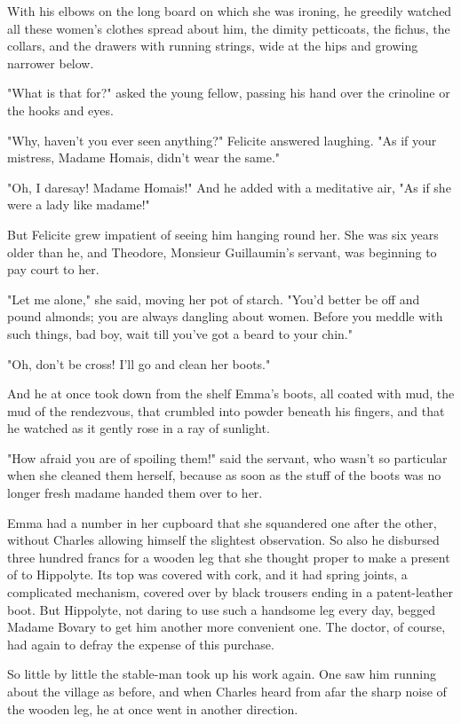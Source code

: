 \documentclass{tufte-book}
\begin{document}
With his elbows on the long board on which she was ironing, he
greedily watched all these women's clothes spread about him, the dimity
petticoats, the fichus, the collars, and the drawers with running
strings, wide at the hips and growing narrower below.

"What is that for?" asked the young fellow, passing his hand over the
crinoline or the hooks and eyes.

"Why, haven't you ever seen anything?" Felicite answered laughing. "As
if your mistress, Madame Homais, didn't wear the same."

"Oh, I daresay! Madame Homais!" And he added with a meditative air, "As
if she were a lady like madame!"

But Felicite grew impatient of seeing him hanging round her. She was six
years older than he, and Theodore, Monsieur Guillaumin's servant, was
beginning to pay court to her.

"Let me alone," she said, moving her pot of starch. "You'd better be
off and pound almonds; you are always dangling about women. Before you
meddle with such things, bad boy, wait till you've got a beard to your
chin."

"Oh, don't be cross! I'll go and clean her boots."

And he at once took down from the shelf Emma's boots, all coated with
mud, the mud of the rendezvous, that crumbled into powder beneath his
fingers, and that he watched as it gently rose in a ray of sunlight.

"How afraid you are of spoiling them!" said the servant, who wasn't so
particular when she cleaned them herself, because as soon as the stuff
of the boots was no longer fresh madame handed them over to her.

Emma had a number in her cupboard that she squandered one after the
other, without Charles allowing himself the slightest observation. So
also he disbursed three hundred francs for a wooden leg that she thought
proper to make a present of to Hippolyte. Its top was covered with cork,
and it had spring joints, a complicated mechanism, covered over by black
trousers ending in a patent-leather boot. But Hippolyte, not daring
to use such a handsome leg every day, begged Madame Bovary to get him
another more convenient one. The doctor, of course, had again to defray
the expense of this purchase.

So little by little the stable-man took up his work again. One saw him
running about the village as before, and when Charles heard from afar
the sharp noise of the wooden leg, he at once went in another direction.
\end{document}
